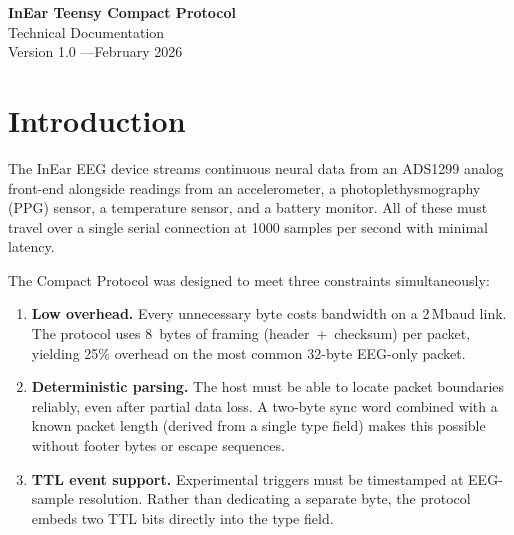\documentclass[11pt,a4paper]{article}
\begin{document}
\begin{center}
    {\LARGE\bfseries InEar Teensy Compact Protocol} \\[0.4em]
    {\large Technical Documentation} \\[0.8em]
    {\small Version 1.0 \quad---\quad February 2026}
\end{center}

\vspace{0.5em}

\begin{abstract}
\noindent
This document describes the Compact Protocol, a binary streaming format used by the InEar EEG system to transmit 8-channel electroencephalography data and auxiliary sensor readings from a Teensy~4.1 microcontroller to a host application over a 2\,Mbaud serial link.  It is written for engineers implementing parsers, firmware modifications, or analysis pipelines, and focuses on how the protocol works, why it is designed the way it is, and what an implementer needs to know.
\end{abstract}

\vspace{0.5em}
\tableofcontents
\vspace{1em}

\section{Introduction}
\label{sec:intro}

The InEar EEG device streams continuous neural data from an ADS1299 analog front-end alongside readings from an accelerometer, a photoplethysmography (PPG) sensor, a temperature sensor, and a battery monitor.  All of these must travel over a single serial connection at 1000 samples per second with minimal latency.

The Compact Protocol was designed to meet three constraints simultaneously:

\begin{enumerate}
    \item \textbf{Low overhead.}  Every unnecessary byte costs bandwidth on a 2\,Mbaud link.  The protocol uses 8~bytes of framing (header~+~checksum) per packet, yielding 25\% overhead on the most common 32-byte EEG-only packet.
    \item \textbf{Deterministic parsing.}  The host must be able to locate packet boundaries reliably, even after partial data loss.  A two-byte sync word combined with a known packet length (derived from a single type field) makes this possible without footer bytes or escape sequences.
    \item \textbf{TTL event support.}  Experimental triggers must be timestamped at EEG-sample resolution.  Rather than dedicating a separate byte, the protocol embeds two TTL bits directly into the type field.
\end{enumerate}
\end{document}
